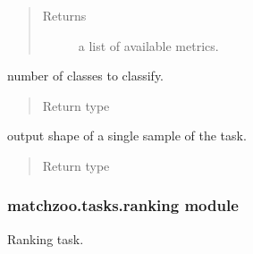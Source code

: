 \documentclass[letterpaper,10pt,english]{sphinxmanual}
\begin{document}
\begin{fulllineitems}
\begin{fulllineitems}
\begin{quote}
\begin{description}
\item[{Returns}] \leavevmode
a list of available metrics.

\end{description}\end{quote}

\end{fulllineitems}


\begin{fulllineitems}
\label{\detokenize{matchzoo.tasks:matchzoo.tasks.classification.Classification.num_classes}}
 \textendash{} number of classes to classify.
\begin{quote}\begin{description}
\item[{Return type}] \leavevmode
{}

\end{description}\end{quote}

\end{fulllineitems}


\begin{fulllineitems}
\label{\detokenize{matchzoo.tasks:matchzoo.tasks.classification.Classification.output_shape}}
 \textendash{} output shape of a single sample of the task.
\begin{quote}\begin{description}
\item[{Return type}] \leavevmode
{}

\end{description}\end{quote}

\end{fulllineitems}


\end{fulllineitems}



\subsubsection{matchzoo.tasks.ranking module}
\label{\detokenize{matchzoo.tasks:matchzoo-tasks-ranking-module}}\label{\detokenize{matchzoo.tasks:module-matchzoo.tasks.ranking}}
Ranking task.
\end{document}
